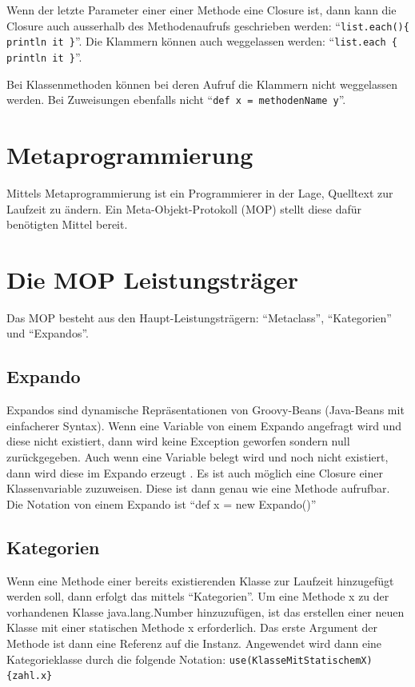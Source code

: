\documentclass[11pt,english,ngerman, headsepline]{scrreprt}
\begin{document}
Wenn der letzte Parameter einer einer Methode eine Closure ist, dann kann die
Closure auch ausserhalb des Methodenaufrufs geschrieben werden:
``\texttt{list.each()\{ println it \}}''. Die Klammern können auch weggelassen
werden: ``\texttt{list.each \{ println it \}}''.  
  
Bei Klassenmethoden können bei deren Aufruf die
Klammern nicht weggelassen werden. Bei Zuweisungen ebenfalls nicht ``\texttt{def
x = methodenName y}''.
   
 
\section{Metaprogrammierung}\label{metaprogrammingLabel}

Mittels Metaprogrammierung ist ein Programmierer in der Lage, Quelltext zur
Laufzeit zu ändern. Ein Meta-Objekt-Protokoll (MOP) stellt diese dafür
benötigten Mittel bereit.
 
 

\section{Die MOP Leistungsträger}
Das MOP besteht aus den Haupt-Leistungsträgern: ``Metaclass'',
``Kategorien'' und ``Expandos''.

\subsection{Expando}\label{expando}

Expandos sind dynamische Repräsentationen von Groovy-Beans (Java-Beans mit
einfacherer Syntax).
Wenn eine Variable von einem Expando angefragt wird und diese nicht existiert, dann wird
keine Exception geworfen sondern null zurückgegeben. Auch wenn eine Variable
belegt wird und noch nicht existiert, dann wird diese im Expando erzeugt
.
Es ist auch möglich eine Closure einer Klassenvariable zuzuweisen.
Diese ist dann genau wie eine Methode aufrufbar. Die Notation von einem
Expando ist ``def x = new Expando()''

\subsection{Kategorien}

Wenn eine Methode einer bereits existierenden Klasse zur Laufzeit hinzugefügt
werden soll, dann erfolgt das mittels ``Kategorien''.
Um eine Methode x zu der vorhandenen Klasse java.lang.Number hinzuzufügen, ist
das erstellen einer neuen Klasse mit einer statischen Methode x erforderlich.
Das erste Argument der Methode ist dann eine Referenz auf die Instanz.
Angewendet wird dann eine Kategorieklasse durch die folgende Notation:
\texttt{use(KlasseMitStatischemX)\{zahl.x\}}
\end{document}
